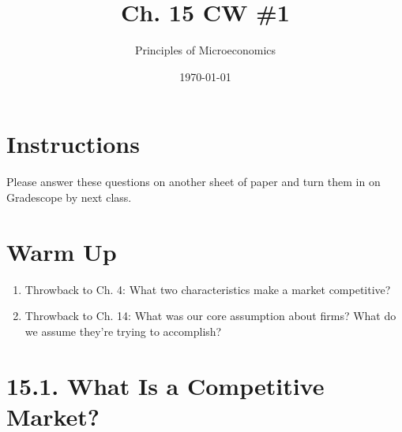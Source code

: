 \documentclass{article}
\title{Ch. 15 CW \#1}
\author{Principles of Microeconomics}
\date{\today}
\begin{document}
\maketitle

\section*{Instructions}

Please answer these questions on another sheet of paper and turn them in on Gradescope by next class.

\section*{Warm Up}

\begin{enumerate}

\item Throwback to Ch. 4: What two characteristics make a market competitive?

\item Throwback to Ch. 14: What was our core assumption about firms? What do we assume they're trying to accomplish?

\end{enumerate}

\section*{15.1. What Is a Competitive Market?}
\end{document}
